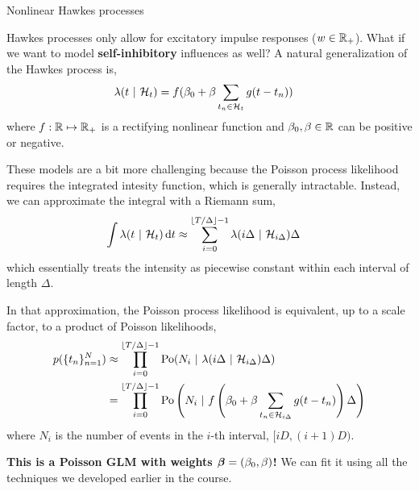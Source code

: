 \documentclass[aspectratio=169]{beamer}
\begin{document}
\begin{frame}[t,allowframebreaks]{Nonlinear Hawkes processes}

Hawkes processes only allow for excitatory impulse responses ($w \in \mathbb{R}_+$). What if we want to model \textbf{self-inhibitory} influences as well? A natural generalization of the Hawkes process is,
\begin{align*}
\lambda(t ~\vert~ \mathcal{H}_t) &= f(\beta_0 + \beta \sum_{t_n \in \mathcal{H}_t} g(t - t_n))
\end{align*}
where $f: \mathbb{R} \mapsto \mathbb{R}_+$ is a rectifying nonlinear function and $\beta_0, \beta \in \mathbb{R}$ can be positive or negative.

These models are a bit more challenging because the Poisson process likelihood requires the integrated intesity function, which is generally intractable. 
Instead, we can approximate the integral with a Riemann sum,
\begin{align*}
\int \lambda(t ~\vert~ \mathcal{H}_t) \mathop{}\!\mathrm{d} t &\approx \sum_{i=0}^{\lfloor {T}/{\Delta}\rfloor - 1} \lambda(i \Delta ~\vert~ \mathcal{H}_{i \Delta}) \Delta
\end{align*}
which essentially treats the intensity as piecewise constant within each interval of length $\Delta$. 

In that approximation, the Poisson process likelihood is equivalent, up to a scale factor, to a product of Poisson likelihoods,
\begin{align*}
p(\{t_n\}_{n=1}^N) &\approx
\prod_{i=0}^{\lfloor {T}/{\Delta}\rfloor - 1} \mathrm{Po}(N_i ~\vert~ \lambda(i \Delta ~\vert~ \mathcal{H}_{i\Delta}) \Delta) \\
&= \prod_{i=0}^{\lfloor {T}/{\Delta}\rfloor - 1} \mathrm{Po}\left(N_i ~\vert~ f\left(\beta_0 + \beta \sum_{t_n \in \mathcal{H}_{i\Delta}}  g(t - t_n) \right) \Delta \right)
\end{align*}
where $N_i$ is the number of events in the $i$-th interval, $[iD, (i+1)D)$.

\textbf{This is a Poisson GLM with weights $\boldsymbol{\beta} = (\beta_0, \beta)$!} We can fit it using all the techniques we developed earlier in the course. 
\end{frame}
\end{document}
